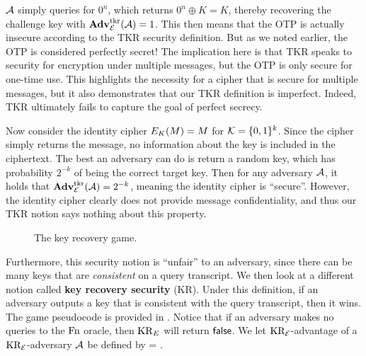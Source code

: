 ${\mathcal A}$ simply queries for $0^n$, which returns $0^n \oplus K = K$, thereby recovering the challenge key with $\mathbf{Adv}^{\mathrm{tkr}}_{{\cal E}}({\mathcal A}) = 1$. This then means that the OTP is actually insecure according to the TKR security definition. But as we noted earlier, the OTP is considered perfectly secret! The implication here is that TKR speaks to security for encryption under multiple messages, but the OTP is only secure for one-time use. This highlights the necessity for a cipher that is secure for multiple messages, but it also demonstrates that our TKR definition is imperfect. Indeed, TKR ultimately fails to capture the goal of perfect secrecy. 

Now consider the identity cipher $E_{K}(M) = M$ for ${\cal K}=\{0,1\}^k$. Since the cipher simply returns the message, no information about the key is included in the ciphertext. The best an adversary can do is return a random key, which has probability $2^{-k}$ of being the correct target key.
Then for any adversary ${\mathcal A}$, it holds that $\mathbf{Adv}^{\mathrm{tkr}}_{{\cal E}}({\mathcal A}) = 2^{-k}$, meaning the identity cipher is ``secure''. However, the identity cipher clearly does not provide message confidentiality, and thus our TKR notion says nothing about this property.

\begin{wrapfigure}[18]{r}{0pt}
	\caption{The key recovery game.}
	\label{fig:kr}
\end{wrapfigure}

Furthermore, this security notion is ``unfair'' to an adversary, since there can be many keys that are \textit{consistent} on a query transcript. We then look at a different notion called \textbf{key recovery security} (KR). Under this definition, if an adversary outputs a key that is consistent with the query transcript, then it wins. The game pseudocode is provided in . Notice that if an adversary makes no queries to the $\textnormal{Fn}$ oracle, then $\textnormal{KR}_E$ will return $\mathsf{false}$.
We let $\textnormal{KR}_{\cal E}$-advantage of a $\textnormal{KR}_{\cal E}$-adversary ${\mathcal A}$ be defined by 
\bnm
\AdvKR{\cipher}{\advA} = \Prob{\KR^\advA_\cipherE \Rightarrow\true}  \;.
\enm

